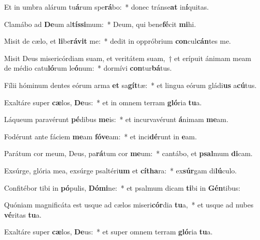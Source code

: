 \item Et in umbra alárum tu\textbf{á}rum spe\textbf{rá}bo:~* donec tránse\textbf{at} in\textbf{í}quitas.
\item Clamábo ad \textbf{De}um al\textbf{tís}\textbf{si}mum:~* Deum, qui bene\textbf{fé}cit \textbf{mi}hi.
\item Misit de cælo, et \textbf{li}be\textbf{rá}\textbf{vit} me:~* dedit in oppróbrium \textbf{con}cul\textbf{cán}tes me.
\item Misit Deus misericórdiam suam, et veritátem suam,~† et erípuit ánimam meam de médio catu\textbf{ló}rum le\textbf{ó}num:~* dormívi \textbf{con}tur\textbf{bá}tus.
\item Fílii hóminum dentes eórum arma \textbf{et} sa\textbf{gít}tæ:~* et lingua eórum gládi\textbf{us} a\textbf{cú}tus.
\item Exaltáre super \textbf{cæ}los, \textbf{De}us:~* et in omnem terram \textbf{gló}ria \textbf{tu}a.
\item Láqueum paravérunt \textbf{pé}dibus \textbf{me}is:~* et incurvavérunt \textbf{á}nimam \textbf{me}am.
\item Fodérunt ante fáciem \textbf{me}am \textbf{fó}\textbf{ve}am:~* et inci\textbf{dé}runt in \textbf{e}am.
\item Parátum cor meum, Deus, pa\textbf{rá}tum cor \textbf{me}um:~* cantábo, et \textbf{psal}mum \textbf{di}cam.
\item Exsúrge, glória mea, exsúrge psaltéri\textbf{um} et \textbf{cí}\textbf{tha}ra:~* ex\textbf{súr}gam di\textbf{lú}culo.
\item Confitébor tibi in \textbf{pó}pulis, \textbf{Dó}\textbf{mi}ne:~* et psalmum dicam \textbf{ti}bi in \textbf{Gén}tibus:
\item Quóniam magnificáta est usque ad cælos miseri\textbf{cór}dia \textbf{tu}a,~* et usque ad nubes \textbf{vé}ritas \textbf{tu}a.
\item Exaltáre super \textbf{cæ}los, \textbf{De}us:~* et super omnem terram \textbf{gló}ria \textbf{tu}a.
